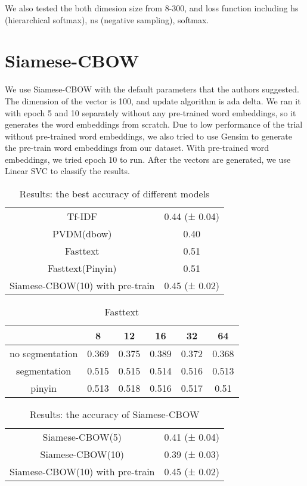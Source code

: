 We also tested the both dimesion size from 8-300, and loss function including hs (hierarchical softmax), ns (negative sampling), softmax.


\section{Siamese-CBOW}

We use Siamese-CBOW with the default parameters that the authors suggested. 
The dimension of the vector is 100, and update algorithm is ada delta. 
We ran it with epoch 5 and 10 separately without any pre-trained word embeddings, so it generates the word embeddings from scratch.
Due to low performance of the trial without pre-trained word embeddings, we also tried to use Gensim to generate the pre-train word embeddings from our dataset.
With pre-trained word embeddings, we tried epoch 10 to run. After the vectors are generated, we use Linear SVC to classify the results. 

\begin{table}[]
\centering
\caption{Results: the best accuracy of different models}
\label{resultAll}
\begin{tabular}{|c|c|}
\hline
Tf-IDF   & 0.44 (± 0.04) \\
PVDM(dbow) & 0.40    \\
Fasttext &  0.51   \\
Fasttext(Pinyin) &  0.51  \\
Siamese-CBOW(10) with pre-train & 0.45 (± 0.02) \\

\hline
\end{tabular}
\end{table}

\begin{table}[]
\centering
\caption{Fasttext}
\label{fasttext}
\begin{tabular}{|c|c|c|c|c|c|}
\hline
   & 8 & 12 & 16 & 32 & 64 \\
\hline
no segmentation  & 0.369 & 0.375 & 0.389 & 0.372 & 0.368 \\
segmentation  & 0.515 & 0.515 & 0.514 & 0.516 & 0.513 \\
pinyin  & 0.513 & 0.518 & 0.516 & 0.517 & 0.51 \\
\hline
\end{tabular}
\end{table}


\begin{table}[]
\centering
\caption{Results: the accuracy of Siamese-CBOW}
\label{resultSCBOW}
\begin{tabular}{|c|c|}
\hline
Siamese-CBOW(5) & 0.41 (± 0.04) \\
Siamese-CBOW(10) & 0.39 (± 0.03) \\
Siamese-CBOW(10) with pre-train & 0.45 (± 0.02) \\
\hline
\end{tabular}
\end{table}

